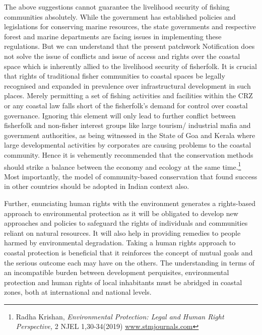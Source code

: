 \begin{multicols}{2}
\noi
The above suggestions cannot guarantee the livelihood security of fishing communities
absolutely. While the government has established policies and legislations for conserving
marine resources, the state governments and respective forest and marine departments are
facing issues in implementing these regulations. But we can understand that the present
patchwork Notification does not solve the issue of conflicts and issue of access and rights
over the coastal space which is inherently allied to the livelihood security of fisherfolk. It is
crucial that rights of traditional fisher communities to coastal spaces be legally recognised
and expanded in prevalence over infrastructural development in such places. Merely
permitting a set of fishing activities and facilities within the CRZ or any coastal law falls
short of the fisherfolk’s demand for control over coastal governance. Ignoring this element
will only lead to further conflict between fisherfolk and non-fisher interest groups like large
tourism/ industrial mafia and government authorities, as being witnessed in the State of Goa
and Kerala where large developmental activities by corporates are causing problems to the coastal community. Hence it is vehemently recommended that the conservation methods
should strike a balance between the economy and ecology at the same time.\footnote{Radha Krishan, \textit{Environmental Protection: Legal and Human Right Perspective,} 2 NJEL 1,30-34(2019)
\url{www.stmjournals.com}} Most
importantly, the model of community-based conservation that found success in other
countries should be adopted in Indian context also.

\noi
Further, enunciating human rights with the environment generates a rights-based approach to
environmental protection as it will be obligated to develop new approaches and policies to
safeguard the rights of individuals and communities reliant on natural resources. It will also
help in providing remedies to people harmed by environmental degradation. Taking a human
rights approach to coastal protection is beneficial that it reinforces the concept of mutual
goals and the serious outcome each may have on the others. The understanding in terms of an
incompatible burden between development perquisites, environmental protection and human
rights of local inhabitants must be abridged in coastal zones, both at international and
national levels.



\end{multicols}
